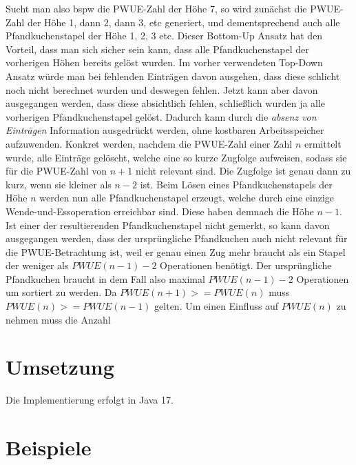 Sucht man also bspw die PWUE-Zahl der Höhe 7, so wird zunächst die PWUE-Zahl der Höhe 1, dann 2, dann 3, etc generiert,
und dementsprechend auch alle Pfandkuchenstapel der Höhe 1, 2, 3 etc.
Dieser Bottom-Up Ansatz hat den Vorteil, dass man sich sicher sein kann, dass alle Pfandkuchenstapel der vorherigen
Höhen bereits gelöst wurden.
Im vorher verwendeten Top-Down Ansatz würde man bei fehlenden Einträgen davon ausgehen, dass diese schlicht noch nicht
berechnet wurden und deswegen fehlen.
Jetzt kann aber davon ausgegangen werden, dass diese absichtlich fehlen,
schlie{\ss}lich wurden ja alle vorherigen Pfandkuchenstapel gelöst.
Dadurch kann durch die \textit{absenz von Einträgen} Information ausgedrückt werden, ohne kostbaren
Arbeitsspeicher aufzuwenden.
Konkret werden, nachdem die PWUE-Zahl einer Zahl $n$ ermittelt wurde, alle Einträge gelöscht, welche eine so kurze Zugfolge
aufweisen, sodass sie für die PWUE-Zahl von $n + 1$ nicht relevant sind.
Die Zugfolge ist genau dann zu kurz, wenn sie kleiner als $n - 2$ ist.
Beim Lösen eines Pfandkuchenstapels der Höhe $n$ werden nun alle Pfandkuchenstapel erzeugt,
welche durch eine einzige Wende-und-Essoperation erreichbar sind.
Diese haben demnach die Höhe $n - 1$.
Ist einer der resultierenden Pfandkuchenstapel nicht gemerkt, so kann davon ausgegangen werden, dass der ursprüngliche
Pfandkuchen auch nicht relevant für die PWUE-Betrachtung ist, weil er genau einen Zug
mehr braucht als ein Stapel der weniger als $PWUE(n - 1) - 2$ Operationen benötigt.
Der ursprüngliche Pfandkuchen braucht in dem Fall also maximal $PWUE(n - 1) - 2$ Operationen um sortiert zu werden.
Da $PWUE(n + 1) >= PWUE(n)$ muss $PWUE(n) >= PWUE(n - 1)$ gelten.
Um einen Einfluss auf $PWUE(n)$ zu nehmen muss die Anzahl


\section{Umsetzung}\label{sec:umsetzung}
Die Implementierung erfolgt in Java 17.

\section{Beispiele}\label{sec:beispiele}

